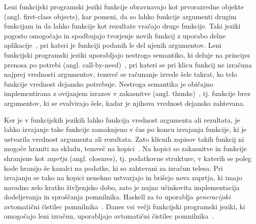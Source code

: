 \documentclass[a4paper, 12pt]{article}
\begin{document}

Leni funkcijski programski jeziki funkcije obravnavajo kot prvorazredne objekte (angl. first-class objects), kar pomeni, da so lahko funkcije argumenti drugim funkcijam in da lahko funkcije kot rezultate vračajo druge funkcije. Taki jeziki pogosto omogočajo in spodbujajo tvorjenje novih funkcij z uporabo delne aplikacije~\cite{10.1145/72551.72554}, pri kateri je funkciji podanih le del njenih argumentov. Leni funkcijski programski jeziki uporabljajo nestrogo semantiko, ki deluje na principu prenosa po potrebi (angl. call-by-need)~\cite{scott2016programming}, pri kateri se pri klicu funkcij ne izračuna najprej vrednosti argumentov, temveč se računanje izvede šele takrat, ko telo funkcije vrednost dejansko potrebuje. Nestroga semantika je običajno implementirana z ovijanjem izrazov v zakasnitve (angl. thunks)~\cite{peyton1987implementation}, tj. funkcije brez argumentov, ki se evalvirajo šele, kadar je njihova vrednost dejansko zahtevana.


Ker je v funkcijskih jezikih lahko funkcija vrednost argumenta ali rezultata, je lahko izvajanje take funkcije zamaknjeno v čas po koncu izvajanja funkcije, ki je ustvarila vrednost argumenta ali rezultata. Zato klicnih zapisov takih funkcij ni mogoče hraniti na skladu, temveč na kopici~\cite{jones2023garbage}. Na kopici so zakasnitve in funkcije shranjene kot \textit{zaprtja} (angl. closures), tj. podatkovne strukture, v katerih se poleg kode hranijo še kazalci na podatke, ki so zahtevani za izračun telesa. Pri izvajanju se tako na kopici nenehno ustvarjajo in brišejo nova zaprtja, ki imajo navadno zelo kratko življenjsko dobo, zato je nujna učinkovita implementacija dodeljevanja in sproščanja pomnilnika. Haskell za to uporablja \textit{generacijski} avtomatični čistilec pomnilnika~\cite{sansom1993generational, GHC}. Danes vsi večji funkcijski programski jeziki, ki omogočajo leni izračun, uporabljajo avtomatični čistilec pomnilnika~\cite{turner1985miranda, czaplicki2012elm, brus1987clean, syme2017the, sperber2009revised6}.
\end{document}
